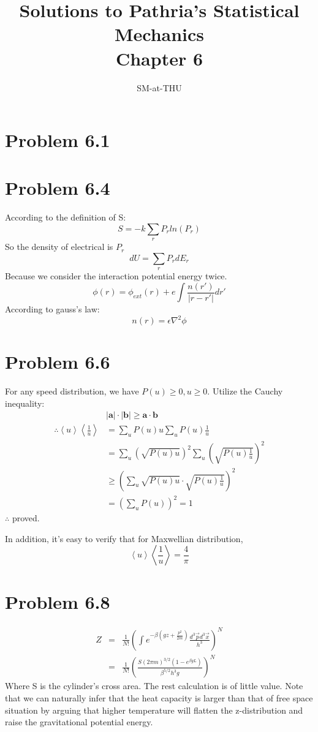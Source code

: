 \documentclass{article}
\author{SM-at-THU}
\title{\bf{Solutions to Pathria's Statistical Mechanics}\\Chapter 6}
\begin{document}
\maketitle
\section*{Problem 6.1}


\section*{Problem 6.4}
According to the definition of S:
$$S=-k\sum_{r}P_{r}ln(P_{r})$$
So the density of electrical is $P_{r}$
$$dU=\sum_{r}P_rdE_r$$
Because we consider the interaction potential energy twice.
$$\phi(r)=\phi_{ext}(r)+e\int\frac{n(r')}{|r-r'|}dr'$$
According to gauss's law:
$$n(r)=\epsilon\nabla^2{\phi}$$


\section*{Problem 6.6} %
\label{sec:problem_6_6}
	For any speed distribution, we have $ P(u)\ge0,u\ge 0 $. Utilize the Cauchy inequality:
	\begin{align*}
		&|\bm a|\cdot|\bm b|\ge \bm a \cdot \bm b\\
		\therefore \left< u\right> \left< \frac{1}{u} \right>&=\sum_u P(u)u \sum_u P(u)\frac{1}{u}\\
		&=\sum_u \left(\sqrt{P(u)u}\right)^2 \sum_u \left(\sqrt{P(u)  \frac{1}{u} }\right)^2\\
		&\ge \left( \sum_u \sqrt{P(u)u} \cdot \sqrt{P(u)  \frac{1}{u}} \right)^2\\
		&=\left( \sum_u P(u) \right)^2=1
	\end{align*}
	$ \therefore $ proved.

	In addition, it's easy to verify that for Maxwellian distribution,
	\begin{equation}
		\left< u\right> \left< \frac{1}{u} \right>=\frac{4}{\pi}
	\end{equation}



\section*{Problem 6.8}
\begin{eqnarray*}
Z&=&\frac{1}{N!}(\int e^{-\beta (gz+\frac{p^2}{2m})}\frac{d^3\vec{p}d^3\vec{x}}{h^3})^N  \\
&=&\frac{1}{N!}(\frac{S(2\pi m)^{3/2}(1-e^{\beta gL})}{\beta^{5/2}h^3 g})^N
\end{eqnarray*}
Where S is the cylinder's cross area. The rest calculation is of little value. Note that we can naturally infer that the heat capacity is larger than that of free space situation by arguing that higher temperature will flatten the z-distribution and raise the gravitational potential energy.
\end{document}
